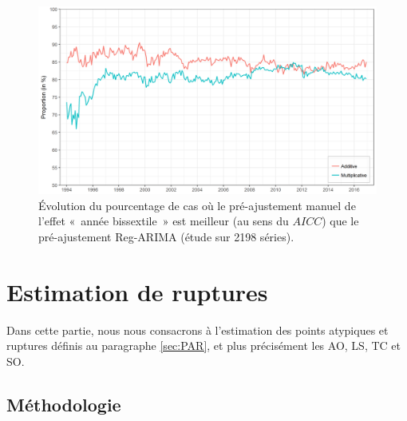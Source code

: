 \documentclass[12pt, a4paper, french]{article}
\begin{document}
\begin{figure}[!ht]
\begin{center}
 \includegraphics[scale=0.65]{img/LYaicc.png}
 \caption[Évolution du pourcentage de cas où le pré-ajustement manuel de l'effet «~année bissextile~» est meilleur (au sens du $AICC$) que le pré-ajustement Reg-ARIMA (étude sur 2198 séries)]{Évolution du pourcentage de cas où le pré-ajustement manuel de l'effet «~année bissextile~» est meilleur (au sens du $AICC$) que le pré-ajustement Reg-ARIMA (étude sur 2198 séries).}
 \label{fig:LYaicc}
\end{center}
\end{figure}

\clearpage

\section{Estimation de ruptures}
\label{sec:AO}

Dans cette partie, nous nous consacrons à l'estimation des points atypiques et ruptures définis au paragraphe \ref{sec:PAR}, et plus précisément les AO, LS, TC et SO.

\subsection{Méthodologie}
\end{document}
